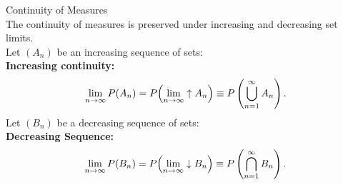 \begin{prop}{Continuity of Measures}\\
The continuity of measures is preserved under increasing and decreasing set limits. \\

\noindent Let \((A_n)\) be an increasing sequence of sets:\\
\textbf{Increasing continuity:}
    \[
    \lim_{n \to \infty} P(A_n) = P\qty(\lim_{n \to \infty} \uparrow A_n) \equiv P\left(\bigcup_{n=1}^\infty A_n\right).
    \]
 Let \((B_n)\) be a decreasing sequence of sets:\\
 \textbf{Decreasing Sequence:}
    \[
    \lim_{n \to \infty} P(B_n) = P\qty(\lim_{n \to \infty} \downarrow B_n) \equiv P\left(\bigcap_{n=1}^\infty B_n\right).
    \]
\end{prop}
